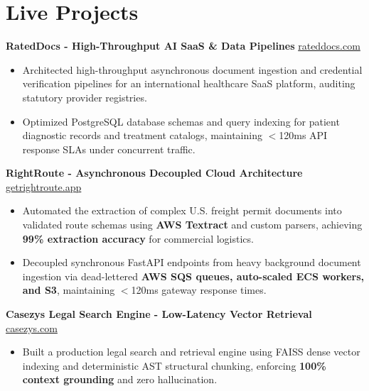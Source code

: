 \documentclass[9.5pt,a4paper]{article}
\begin{document}
\section*{Live Projects}
\noindent
\textbf{RatedDocs - High-Throughput AI SaaS \& Data Pipelines} \hfill \href{https://rateddocs.com}{rateddocs.com}
\begin{itemize}
    \item Architected high-throughput asynchronous document ingestion and credential verification pipelines for an international healthcare SaaS platform, auditing statutory provider registries.
    \item Optimized PostgreSQL database schemas and query indexing for patient diagnostic records and treatment catalogs, maintaining $<$120ms API response SLAs under concurrent traffic.
\end{itemize}
\vspace{0.6pt}
\noindent
\textbf{RightRoute - Asynchronous Decoupled Cloud Architecture} \hfill \href{https://getrightroute.app}{getrightroute.app}
\begin{itemize}
    \item Automated the extraction of complex U.S. freight permit documents into validated route schemas using \textbf{AWS Textract} and custom parsers, achieving \textbf{99\% extraction accuracy} for commercial logistics.
    \item Decoupled synchronous FastAPI endpoints from heavy background document ingestion via dead-lettered \textbf{AWS SQS queues, auto-scaled ECS workers, and S3}, maintaining $<$120ms gateway response times.
\end{itemize}
\vspace{0.6pt}
\noindent
\textbf{Casezys Legal Search Engine - Low-Latency Vector Retrieval} \hfill \href{https://casezys.com}{casezys.com}
\begin{itemize}
    \item Built a production legal search and retrieval engine using FAISS dense vector indexing and deterministic AST structural chunking, enforcing \textbf{100\% context grounding} and zero hallucination.
\end{itemize}
\vspace{0.6pt}
\end{document}
